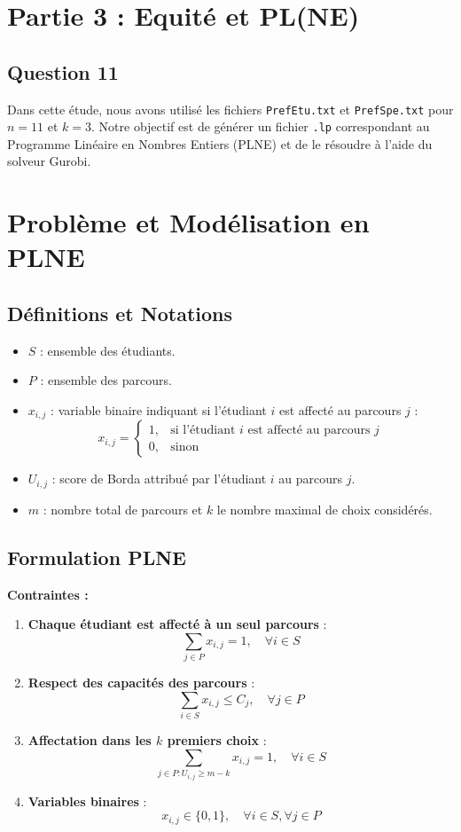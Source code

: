 \documentclass[a4paper,11pt]{article}
\begin{document}
\section*{Partie 3 : Equité et PL(NE)}

\subsection*{Question 11}

Dans cette étude, nous avons utilisé les fichiers \texttt{PrefEtu.txt} et \texttt{PrefSpe.txt} pour \( n = 11 \) et \( k = 3 \). Notre objectif est de générer un fichier \texttt{.lp} correspondant au Programme Linéaire en Nombres Entiers (PLNE) et de le résoudre à l'aide du solveur Gurobi.

\section{Problème et Modélisation en PLNE}

\subsection{Définitions et Notations}
\begin{itemize}
    \item \( S \) : ensemble des étudiants.
    \item \( P \) : ensemble des parcours.
    \item \( x_{i,j} \) : variable binaire indiquant si l’étudiant \( i \) est affecté au parcours \( j \) :
    \[
    x_{i,j} = \begin{cases} 
    1, & \text{si l’étudiant } i \text{ est affecté au parcours } j \\
    0, & \text{sinon}
    \end{cases}
    \]
    \item \( U_{i,j} \) : score de Borda attribué par l’étudiant \( i \) au parcours \( j \).
    \item \( m \) : nombre total de parcours et \( k \) le nombre maximal de choix considérés.
\end{itemize}

\subsection{Formulation PLNE}
\textbf{Contraintes :}
\begin{enumerate}
    \item \textbf{Chaque étudiant est affecté à un seul parcours} :
    \[
    \sum_{j \in P} x_{i,j} = 1, \quad \forall i \in S
    \]
    \item \textbf{Respect des capacités des parcours} :
    \[
    \sum_{i \in S} x_{i,j} \leq C_j, \quad \forall j \in P
    \]
    \item \textbf{Affectation dans les \( k \) premiers choix} :
    \[
    \sum_{j \in P : U_{i,j} \geq m - k} x_{i,j} = 1, \quad \forall i \in S
    \]
    \item \textbf{Variables binaires} :
    \[
    x_{i,j} \in \{0,1\}, \quad \forall i \in S, \forall j \in P
    \]
\end{enumerate}
\end{document}
